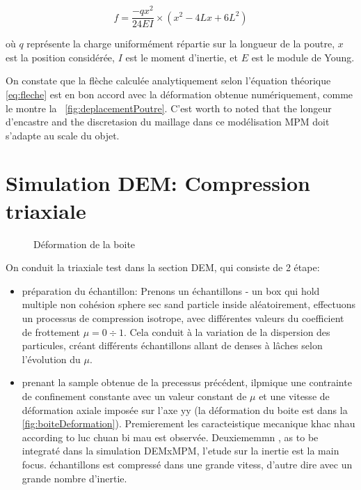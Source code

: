 \documentclass[a4paper,12pt]{report}
\begin{document}
\begin{equation}
    f = \dfrac{-qx^2}{24EI} \times (x^2 - 4Lx + 6L^2)
    \label{eq:fleche}
\end{equation}

où $q$ représente la charge uniformément répartie sur la longueur de la poutre, $x$ est la position considérée, $I$ est le moment d'inertie, et $E$ est le module de Young.

On constate que la flèche calculée analytiquement selon l'équation théorique \eqref{eq:fleche} est en bon accord avec la déformation obtenue numériquement, comme le montre la ~\autoref{fig:deplacementPoutre}.
C'est worth to noted that the longeur d'encastre and the discretasion du maillage dans ce modélisation MPM doit s'adapte au scale du objet.





\section{Simulation DEM: Compression triaxiale}

    \begin{figure}[h]
        \centering
        \caption{Déformation de la boite}
        \label{fig:boiteDeformation}
    \end{figure}
On conduit la triaxiale test dans la section DEM, qui consiste de 2 étape: 
\begin{itemize}
\item préparation du échantillon: Prenons un échantillons - un box qui hold multiple non cohésion sphere sec sand particle inside aléatoirement, effectuons un processus de compression isotrope, avec différentes valeurs du coefficient de frottement $\mu = 0 \div 1$. 
Cela conduit à la variation de la dispersion des particules, créant différents échantillons allant de denses à lâches selon l'évolution du $\mu$.
\item prenant la sample obtenue de la precessus précédent, ilpmique une contrainte de confinement constante avec un valeur constant de $\mu$ et une vitesse de déformation axiale imposée sur l'axe yy (la déformation du boite est dans la \autoref{fig:boiteDeformation}). 
Premierement les caracteistique mecanique khac nhau according to luc chuan bi mau est observée.
Deuxiememmn , as to be integraté dans la simulation DEMxMPM, l'etude sur la inertie est la main focus. échantillons est compressé dans une grande vitess, d'autre dire avec un grande nombre d'inertie.
\end{itemize}
\end{document}
